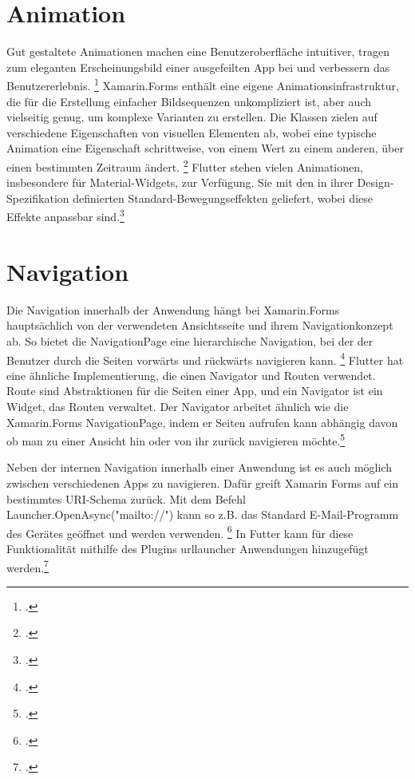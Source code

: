 \section{Animation}
Gut gestaltete Animationen machen eine Benutzeroberfläche intuitiver, tragen zum eleganten Erscheinungsbild einer ausgefeilten App bei und verbessern das Benutzererlebnis.  \footcite[Vgl.][Abgerufen am \today]{GoogleFlutterAnimations2020} 
Xamarin.Forms enthält eine eigene Animationsinfrastruktur, die für die Erstellung einfacher Bildsequenzen unkompliziert ist, aber auch vielseitig genug, um komplexe Varianten zu erstellen.  Die Klassen zielen auf verschiedene Eigenschaften von visuellen Elementen ab, wobei eine typische Animation eine Eigenschaft schrittweise, von einem Wert zu einem anderen, über einen bestimmten Zeitraum ändert. \footcite[Vgl.][Abgerufen am \today]{Microsoftanimations2020} 
Flutter stehen vielen Animationen,  insbesondere für Material-Widgets, zur Verfügung.  Sie mit den in ihrer Design-Spezifikation definierten Standard-Bewegungseffekten geliefert,  wobei diese Effekte anpassbar sind.\footcite[Vgl.][Abgerufen am \today]{GoogleFlutterAnimations2020} 

\section{Navigation}
\label{sec:nav}

Die Navigation innerhalb der Anwendung hängt bei Xamarin.Forms hauptsächlich von der verwendeten Ansichtsseite und ihrem Navigationkonzept ab.  So bietet die NavigationPage eine hierarchische Navigation, bei der der Benutzer durch die Seiten vorwärts und rückwärts navigieren kann. \footcite[Vgl.][Abgerufen am \today]{MicrosoftXamNavigation2020}   Flutter hat eine ähnliche Implementierung,  die einen Navigator und Routen verwendet.  Route sind  Abstraktionen für die Seiten einer App, und ein Navigator ist ein Widget, das Routen verwaltet.  Der Navigator arbeitet ähnlich wie die Xamarin.Forms NavigationPage, indem er Seiten aufrufen kann abhängig davon ob man zu einer Ansicht hin oder von ihr zurück navigieren möchte.\footcite[Vgl.][Abgerufen am \today]{GoogleFlutterNavigation2020} 


Neben der internen Navigation innerhalb einer Anwendung ist es auch möglich zwischen verschiedenen Apps zu navigieren.  Dafür greift Xamarin Forms auf ein bestimmtes URI-Schema zurück.  Mit dem Befehl Launcher.OpenAsync("mailto://") kann so z.B. das  Standard E-Mail-Programm des Gerätes geöffnet und werden verwenden. \footcite[Vgl.][Abgerufen am \today]{MicrosoftLauncher2020}  In Futter kann für diese Funktionalität mithilfe des Plugins urllauncher Anwendungen hinzugefügt werden.\footcite[Vgl.][Abgerufen am \today]{Googleurllauncher2020} 

